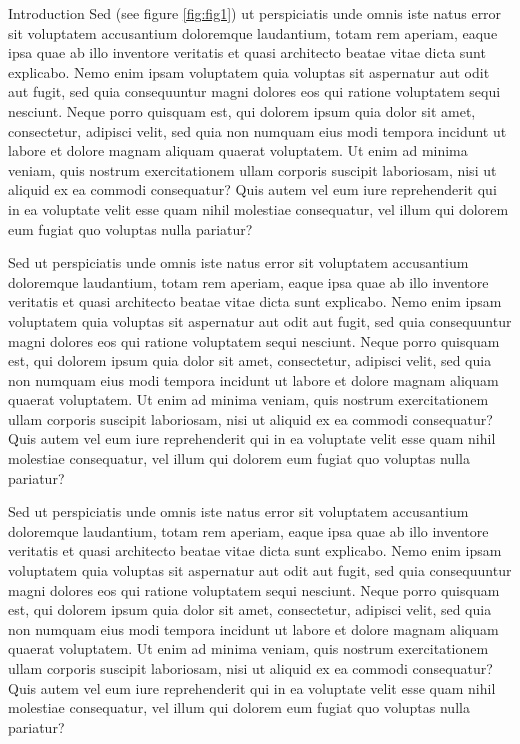 \documentclass{article}
\begin{document}
\begin{mychapter+}{Introduction}
	Sed (see figure \ref{fig:fig1}) ut perspiciatis unde omnis iste natus error sit voluptatem accusantium doloremque laudantium, totam rem aperiam, eaque ipsa quae ab illo inventore veritatis et quasi architecto beatae vitae dicta sunt explicabo. Nemo enim ipsam voluptatem quia voluptas sit aspernatur aut odit aut fugit, sed quia consequuntur magni dolores eos qui ratione voluptatem sequi nesciunt. Neque porro quisquam est, qui dolorem ipsum quia dolor sit amet, consectetur, adipisci velit, sed quia non numquam eius modi tempora incidunt ut labore et dolore magnam aliquam quaerat voluptatem. Ut enim ad minima veniam, quis nostrum exercitationem ullam corporis suscipit laboriosam, nisi ut aliquid ex ea commodi consequatur? Quis autem vel eum iure reprehenderit qui in ea voluptate velit esse quam nihil molestiae consequatur, vel illum qui dolorem eum fugiat quo voluptas nulla pariatur?
	
	Sed ut perspiciatis unde omnis iste natus error sit voluptatem accusantium doloremque laudantium, totam rem aperiam, eaque ipsa quae ab illo inventore veritatis et quasi architecto beatae vitae dicta sunt explicabo. Nemo enim ipsam voluptatem quia voluptas sit aspernatur aut odit aut fugit, sed quia consequuntur magni dolores eos qui ratione voluptatem sequi nesciunt. Neque porro quisquam est, qui dolorem ipsum quia dolor sit amet, consectetur, adipisci velit, sed quia non numquam eius modi tempora incidunt ut labore et dolore magnam aliquam quaerat voluptatem. Ut enim ad minima veniam, quis nostrum exercitationem ullam corporis suscipit laboriosam, nisi ut aliquid ex ea commodi consequatur? Quis autem vel eum iure reprehenderit qui in ea voluptate velit esse quam nihil molestiae consequatur, vel illum qui dolorem eum fugiat quo voluptas nulla pariatur?

	Sed ut perspiciatis unde omnis iste natus error sit voluptatem accusantium doloremque laudantium, totam rem aperiam, eaque ipsa quae ab illo inventore veritatis et quasi architecto beatae vitae dicta sunt explicabo. Nemo enim ipsam voluptatem quia voluptas sit aspernatur aut odit aut fugit, sed quia consequuntur magni dolores eos qui ratione voluptatem sequi nesciunt. Neque porro quisquam est, qui dolorem ipsum quia dolor sit amet, consectetur, adipisci velit, sed quia non numquam eius modi tempora incidunt ut labore et dolore magnam aliquam quaerat voluptatem. Ut enim ad minima veniam, quis nostrum exercitationem ullam corporis suscipit laboriosam, nisi ut aliquid ex ea commodi consequatur? Quis autem vel eum iure reprehenderit qui in ea voluptate velit esse quam nihil molestiae consequatur, vel illum qui dolorem eum fugiat quo voluptas nulla pariatur?
	\end{mychapter+}
\end{document}
